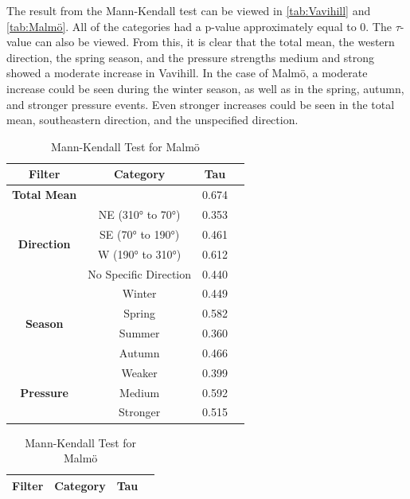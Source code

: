 The result from the Mann-Kendall test can be viewed in \autoref{tab:Vavihill} and \autoref{tab:Malmö}. All of the categories had a p-value approximately equal to 0. The $\tau$-value can also be viewed. From this, it is clear that the total mean, the western direction, the spring season, and the pressure strengths medium and strong showed a moderate increase in Vavihill. In the case of Malmö, a moderate increase could be seen during the winter season, as well as in the spring, autumn, and stronger pressure events. Even stronger increases could be seen in the total mean, southeastern direction, and the unspecified direction.

\begin{table}[H]
    \centering
    \begin{minipage}{0.45\textwidth}
        \centering
        \caption{Mann-Kendall Test for Vavihill}
        \label{tab:Vavihill}
        \begin{tabular}{@{}cccc@{}}
        \toprule
        \textbf{Filter} & \textbf{Category} & \textbf{Tau} \\ \midrule
        \multirow{1}{*}{\textbf{Total Mean}} &  & 0.674 \\ \midrule    \multirow{4}{*}{\textbf{Direction}} & NE (310° to 70°)  & 0.353 \\  & SE (70° to 190°)  & 0.461 \\  & W (190° to 310°)  & 0.612 \\  & No Specific Direction  & 0.440 \\  \midrule   \multirow{4}{*}{\textbf{Season}} & Winter  & 0.449 \\  & Spring  & 0.582 \\  & Summer  & 0.360 \\  & Autumn  & 0.466 \\  \midrule    \multirow{4}{*}{\textbf{Pressure}} & Weaker  & 0.399 \\  & Medium  & 0.592 \\  & Stronger  & 0.515 \\ 
        \bottomrule
        \end{tabular}
    \end{minipage}
     \hfill 
    \begin{minipage}{0.45\textwidth}
        \centering
        \caption{Mann-Kendall Test for Malmö}
        \label{tab:Malmö}
        \begin{tabular}{@{}cccc@{}}
        \toprule
        \textbf{Filter} & \textbf{Category} & \textbf{Tau} \\ \midrule

\end{tabular}
\end{minipage}
\end{table}

